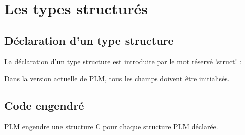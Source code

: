 




\chapter{Les types structurés}


\section{Déclaration d'un type structure}

La déclaration d'un type structure est introduite par le mot réservé \plm!struct! :


Dans la version actuelle de PLM, tous les champs doivent être initialisés.


\section{Code engendré}

PLM engendre une structure C pour chaque structure PLM déclarée.


